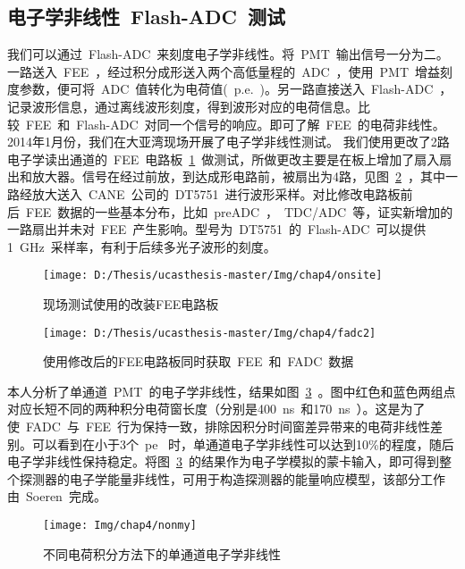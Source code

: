 \subsection{电子学非线性~Flash-ADC~测试}
我们可以通过~Flash-ADC~来刻度电子学非线性。将~PMT~输出信号一分为二。一路送入~FEE~，经过积分成形送入两个高低量程的~ADC~，使用~PMT~增益刻度参数，便可将~ADC~值转化为电荷值(~p.e.~)。另一路直接送入~Flash-ADC~，记录波形信息，通过离线波形刻度，得到波形对应的电荷信息。比较~FEE~和~Flash-ADC~对同一个信号的响应。即可了解~FEE~的电荷非线性。
2014年1月份，我们在大亚湾现场开展了电子学非线性测试。
我们使用更改了2路电子学读出通道的~FEE~电路板~\ref{fig:onsite_1}~做测试，所做更改主要是在板上增加了扇入扇出和放大器。信号在经过前放，到达成形电路前，被扇出为4路，见图~\ref{fig:onsite_2}~，其中一路经放大送入~CANE~公司的~DT5751~进行波形采样。对比修改电路板前后~FEE~数据的一些基本分布，比如~preADC~，~TDC/ADC~等，证实新增加的一路扇出并未对~FEE~产生影响。型号为~DT5751~的~Flash-ADC~可以提供1~GHz~采样率，有利于后续多光子波形的刻度。
\begin{figure}[!htb]
  \centering
   \texttt{[image: D:/Thesis/ucasthesis-master/Img/chap4/onsite]}
    \caption{现场测试使用的改装FEE电路板}
  \label{fig:onsite_1}
\end{figure}

\begin{figure}[!htb]
  \centering
     \texttt{[image: D:/Thesis/ucasthesis-master/Img/chap4/fadc2]}
    \caption{使用修改后的FEE电路板同时获取~FEE~和~FADC~数据}
  \label{fig:onsite_2}
\end{figure}
本人分析了单通道~PMT~的电子学非线性，结果如图~\ref{fig:mynon}~。图中红色和蓝色两组点对应长短不同的两种积分电荷窗长度（分别是400~ns~和170~ns~）。这是为了使~FADC~与~FEE~行为保持一致，排除因积分时间窗差异带来的电荷非线性差别。可以看到在小于3个~pe~ 时，单通道电子学非线性可以达到10\%的程度，随后电子学非线性保持稳定。将图~\ref{fig:mynon}~的结果作为电子学模拟的蒙卡输入，即可得到整个探测器的电子学能量非线性，可用于构造探测器的能量响应模型，该部分工作由~Soeren~完成。

\begin{figure}[!htbp]
  \centering
   \texttt{[image: Img/chap4/nonmy]}
    \caption{不同电荷积分方法下的单通道电子学非线性}
  \label{fig:mynon}
\end{figure}
